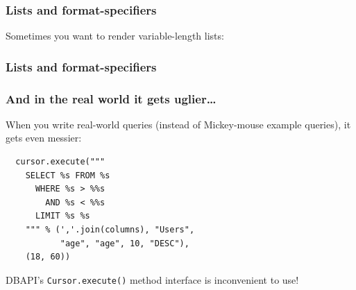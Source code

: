 \documentclass{beamer}
\begin{document}
\begin{frame}[fragile]
  \frametitle{Lists and format-specifiers}

  Sometimes you want to render variable-length lists:

\vfill\pause
{}

\end{frame}


\begin{frame}[fragile]
  \frametitle{Lists and format-specifiers}
  

\end{frame}


\begin{frame}[fragile]
  \frametitle{And in the real world it gets uglier\dots}

  When you write real-world queries (instead of Mickey-mouse example
  queries), it gets even messier:
\begin{verbatim}
  cursor.execute("""
    SELECT %s FROM %s 
      WHERE %s > %%s 
        AND %s < %%s 
      LIMIT %s %s
    """ % (','.join(columns), "Users",
           "age", "age", 10, "DESC"), 
    (18, 60))
\end{verbatim}

\vfill
DBAPI's \texttt{Cursor.execute()} method interface is inconvenient to use!

\end{frame}
\end{document}
